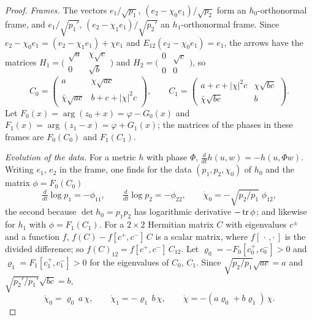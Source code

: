 \begin{proof}
\emph{Frames.} The vectors $e_1/\sqrt{p_1}$, $(e_2-\chi_0e_1)/\sqrt{p_2}$ form
an $h_0$-orthonormal frame, and $e_1/\sqrt{p_1'}$,
$(e_2-\chi_1e_1)/\sqrt{p_2'}$ an $h_1$-orthonormal frame. Since
$e_2-\chi_0e_1=(e_2-\chi_1e_1)+\chi e_1$ and $E_{12}(e_2-\chi_0e_1)=e_1$, the
arrows have the matrices
$H_1=\bigl(\begin{smallmatrix}\sqrt a&\chi\sqrt c\\0&\sqrt b\end{smallmatrix}\bigr)$
and $H_2=\bigl(\begin{smallmatrix}0&\sqrt c\\0&0\end{smallmatrix}\bigr)$, so
\[
 C_0=\begin{pmatrix}a&\chi\sqrt{ac}\\\bar\chi\sqrt{ac}&b+c+|\chi|^2c\end{pmatrix},\qquad
 C_1=\begin{pmatrix}a+c+|\chi|^2c&\chi\sqrt{bc}\\\bar\chi\sqrt{bc}&b\end{pmatrix}.
\]
Let $F_0(x)=\arg(z_0+x)=\varphi-G_0(x)$ and
$F_1(x)=\arg(z_1-x)=\varphi+G_1(x)$; the matrices of the phases in these
frames are $F_0(C_0)$ and $F_1(C_1)$.

\emph{Evolution of the data.} For a metric $h$ with phase $\Phi$,
$\frac d{dt}h(u,w)=-h(u,\Phi w)$. Writing $e_1$, $e_2$ in the frame, one finds
for the data $(p_1,p_2,\chi_0)$ of $h_0$ and the matrix $\phi=F_0(C_0)$
\[
 \tfrac d{dt}\log p_1=-\phi_{11},\qquad\tfrac d{dt}\log p_2=-\phi_{22},\qquad
 \dot\chi_0=-\sqrt{p_2/p_1}\;\phi_{12},
\]
the second because $\det h_0=p_1p_2$ has logarithmic derivative $-\operatorname{tr}\phi$;
and likewise for $h_1$ with $\phi=F_1(C_1)$. For a $2\times2$ Hermitian matrix
$C$ with eigenvalues $c^\pm$ and a function $f$, $f(C)-f[c^+,c^-]\,C$ is a
scalar matrix, where $f[\,\cdot\,,\cdot\,]$ is the divided difference; so
$f(C)_{12}=f[c^+,c^-]\,C_{12}$. Let $\varrho_0=-F_0[c_0^+,c_0^-]>0$ and
$\varrho_1=F_1[c_1^+,c_1^-]>0$ for the eigenvalues of $C_0$, $C_1$. Since
$\sqrt{p_2/p_1}\sqrt{ac}=a$ and $\sqrt{p_2'/p_1'}\sqrt{bc}=b$,
\begin{equation}\label{eq:chi}
 \dot\chi_0=\varrho_0\,a\,\chi,\qquad\dot\chi_1=-\varrho_1\,b\,\chi,\qquad
 \dot\chi=-(a\varrho_0+b\varrho_1)\,\chi .
\end{equation}


\end{proof}
